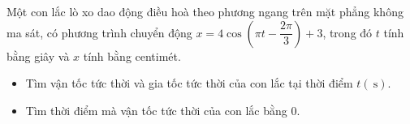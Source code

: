 \begin{bt}%
	Một con lắc lò xo dao động điều hoà theo phương ngang trên mặt phẳng không ma sát, có phương trình chuyển động $x=4 \cos \left(\pi t-\dfrac{2 \pi}{3}\right)+3$, trong đó $t$ tính bằng giây và $x$ tính bằng centimét.
	\begin{itemize}
		\item[a)] Tìm vận tốc tức thời và gia tốc tức thời của con lắc tại thời điểm $t(\mathrm{~s})$.
		\item[b)] Tìm thời điểm mà vận tốc tức thời của con lắc bằng $0$.
	\end{itemize}
\end{bt}

